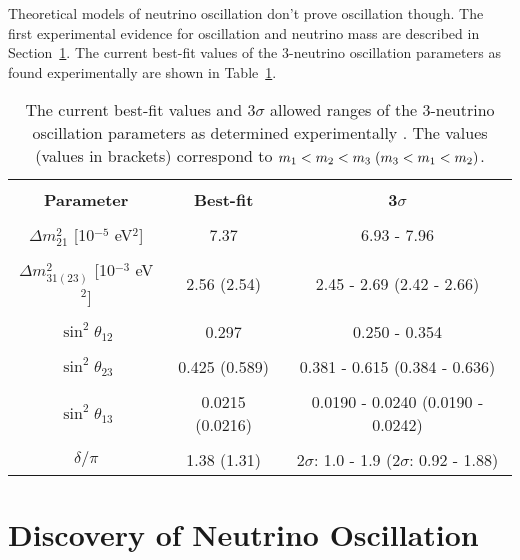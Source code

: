 Theoretical models of neutrino oscillation don't prove oscillation though. The first experimental evidence for oscillation and neutrino mass are described in Section~\ref{sec:NeutrinoOsc}.
The current best-fit values of the 3-neutrino oscillation parameters as found experimentally are shown in Table~\ref{tab:ParamValues}.


\begin{table}
	\centering
\begin{tabular}{ccc}
	\hline
	\vspace{-0.3cm} \\ 
	\textbf{Parameter} & \textbf{Best-fit} & \textbf{3$\sigma$} \vspace{0.1cm} \\ 
	\hline 
	\vspace{-0.3cm} \\
	$\Delta m^2_{21}$ [10$^{-5}$ eV$^2$] & 7.37 & 6.93 - 7.96 \\ 
	\vspace{-0.3cm} \\
	$\Delta m^2_{31(23)}$ [10$^{-3}$ eV$^2$] & 2.56 (2.54) & 2.45 - 2.69 (2.42 - 2.66) \\ 
	\vspace{-0.3cm} \\
	$\sin^2\theta_{12}$  & 0.297 & 0.250 - 0.354 \\ 
	\vspace{-0.3cm} \\
	$\sin^2\theta_{23}$  & 0.425 (0.589) & 0.381 - 0.615 (0.384 - 0.636) \\ 
	\vspace{-0.3cm} \\
	$\sin^2\theta_{13}$  & 0.0215 (0.0216) & 0.0190 - 0.0240 (0.0190 - 0.0242) \\ 
	\vspace{-0.3cm} \\
	$\delta/\pi$ & 1.38 (1.31) & 2$\sigma$: 1.0 - 1.9 (2$\sigma$: 0.92 - 1.88) \\ 
	\hline 
\end{tabular} 
\caption[Neutrino Oscillation Parameters]{The current best-fit values and 3$\sigma$ allowed ranges of the 3-neutrino oscillation parameters as determined experimentally \cite{PDG}. The values (values in brackets) correspond to $m_1 < m_2 < m_3 \hspace{0.1cm} (m_3 < m_1 < m_2)$.}
\label{tab:ParamValues}
\end{table}


\section{Discovery of Neutrino Oscillation} \label{sec:NeutrinoOsc}

